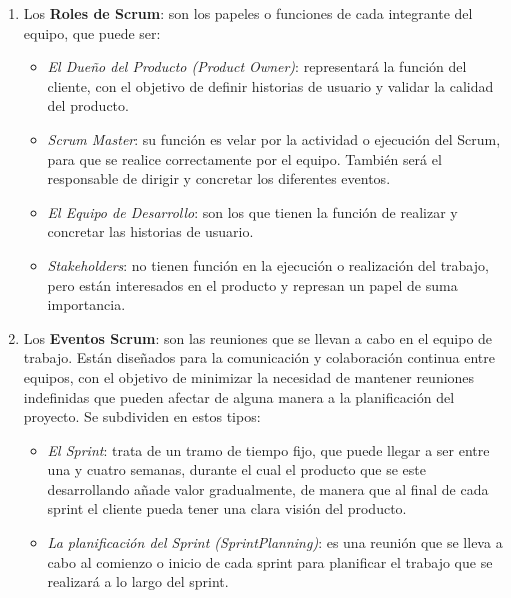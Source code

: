 \begin{enumerate}

    \item
    Los \textbf{Roles de Scrum}: son los papeles o funciones de cada integrante del equipo, que puede ser:
    
        \begin{itemize}
            \item
            \textit{El Dueño del Producto (Product Owner)}: representará la función del cliente, con el objetivo de definir historias de usuario y validar la calidad del producto.
    
            \item
            \textit{Scrum Master}: su función es velar por la actividad o ejecución del Scrum, para que se realice correctamente por el equipo. También será el responsable de dirigir y concretar los diferentes eventos.
    
            \item
            \textit{El Equipo de Desarrollo}: son los que tienen la función de realizar y concretar las historias de usuario.
    
            \item
            \textit{Stakeholders}: no tienen función en la ejecución o realización del trabajo, pero están interesados en el producto y represan un papel de suma importancia.
    
        \end{itemize}

    \item
    Los \textbf{Eventos Scrum}: son las reuniones que se llevan a cabo en el equipo de trabajo. Están diseñados para la comunicación y colaboración continua entre equipos, con el objetivo de minimizar la necesidad de mantener reuniones indefinidas que pueden afectar de alguna manera a la planificación del proyecto. Se subdividen en estos tipos:

        \begin{itemize}
            \item
            \textit{El Sprint}: trata de un tramo de tiempo fijo, que puede llegar a ser entre una y cuatro semanas, durante el cual el producto que se este desarrollando añade valor gradualmente, de manera que al final de cada sprint el cliente pueda tener una clara visión del producto.
    
            \item
            \textit{La planificación del Sprint (SprintPlanning)}: es una reunión que se lleva a cabo al comienzo o inicio de cada sprint para planificar el trabajo que se realizará a lo largo del sprint.
    

\end{itemize}
\end{enumerate}
